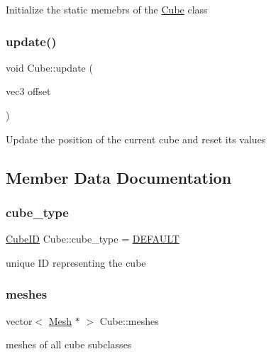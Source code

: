 Initialize the static memebrs of the \mbox{\hyperlink{classCube}{Cube}} class \mbox{\label{classCube_a038c53e0df559a029e9558a7f4b16e56}} 
\subsubsection{\texorpdfstring{update()}{update()}}
{\footnotesize\ttfamily void Cube\+::update (\begin{DoxyParamCaption}\item[{vec3}]{offset }\end{DoxyParamCaption})}

Update the position of the current cube and reset its values 

\subsection{Member Data Documentation}
\mbox{\label{classCube_a4c15451eb6d1f99fd08f1f840aa8cec7}} 
\subsubsection{\texorpdfstring{cube\+\_\+type}{cube\_type}}
{\footnotesize\ttfamily \mbox{\hyperlink{Cube_8hpp_ae2a13060ddab6f6437cc4d66a1f7c370}{Cube\+ID}} Cube\+::cube\+\_\+type = \mbox{\hyperlink{Cube_8hpp_ae2a13060ddab6f6437cc4d66a1f7c370a88ec7d5086d2469ba843c7fcceade8a6}{D\+E\+F\+A\+U\+LT}}}



unique ID representing the cube 

\mbox{\label{classCube_a4470b28c7fff28dd9058ea96307c1000}} 
\subsubsection{\texorpdfstring{meshes}{meshes}}
{\footnotesize\ttfamily vector$<$ \mbox{\hyperlink{structMesh}{Mesh}} $\ast$ $>$ Cube\+::meshes\hspace{0.3cm}{\ttfamily [static]}}



meshes of all cube subclasses 

